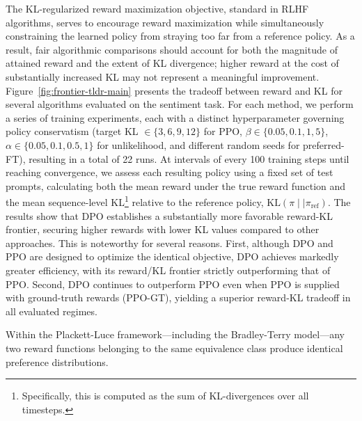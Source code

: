 The KL-regularized reward maximization objective, standard in RLHF algorithms, serves to encourage reward maximization while simultaneously constraining the learned policy from straying too far from a reference policy. As a result, fair algorithmic comparisons should account for both the magnitude of attained reward and the extent of KL divergence; higher reward at the cost of substantially increased KL may not represent a meaningful improvement. Figure~\ref{fig:frontier-tldr-main} presents the tradeoff between reward and KL for several algorithms evaluated on the sentiment task. For each method, we perform a series of training experiments, each with a distinct hyperparameter governing policy conservatism (target KL $\in\{3,6,9,12\}$ for PPO, $\beta \in \{0.05,0.1,1,5\}$, $\alpha\in\{0.05,0.1,0.5,1\}$ for unlikelihood, and different random seeds for preferred-FT), resulting in a total of 22 runs. At intervals of every 100 training steps until reaching convergence, we assess each resulting policy using a fixed set of test prompts, calculating both the mean reward under the true reward function and the mean sequence-level KL\footnote{Specifically, this is computed as the sum of KL-divergences over all timesteps.} relative to the reference policy, $\text{KL}\left(\pi\mid \mid \pi_\text{ref}\right)$. The results show that DPO establishes a substantially more favorable reward-KL frontier, securing higher rewards with lower KL values compared to other approaches. This is noteworthy for several reasons. First, although DPO and PPO are designed to optimize the identical objective, DPO achieves markedly greater efficiency, with its reward/KL frontier strictly outperforming that of PPO. Second, DPO continues to outperform PPO even when PPO is supplied with ground-truth rewards (PPO-GT), yielding a superior reward-KL tradeoff in all evaluated regimes.

\begin{lemma}\label{lemma:same_prefrence}
Within the Plackett-Luce framework—including the Bradley-Terry model—any two reward functions belonging to the same equivalence class produce identical preference distributions.
\end{lemma}

